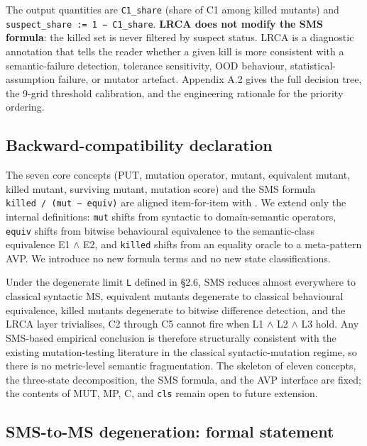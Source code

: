 \documentclass[acmsmall,screen,review]{acmart}
\begin{document}
The output quantities are \texttt{C1\_share} (share of C1 among killed
mutants) and \texttt{suspect\_share\ :=\ 1\ −\ C1\_share}. \textbf{LRCA
does not modify the SMS formula}: the killed set is never filtered by
suspect status. LRCA is a diagnostic annotation that tells the reader
whether a given kill is more consistent with a semantic-failure
detection, tolerance sensitivity, OOD behaviour, statistical-assumption
failure, or mutator artefact. Appendix A.2 gives the full decision tree, the 9-grid
threshold calibration, and the engineering rationale for the priority
ordering.

\subsection{Backward-compatibility declaration}\label{backward-compatibility-declaration}

The seven core concepts (PUT, mutation operator, mutant, equivalent
mutant, killed mutant, surviving mutant, mutation score) and the SMS
formula
\texttt{\textbar{}killed\textbar{}\ /\ (\textbar{}mut\textbar{}\ −\ \textbar{}equiv\textbar{})}
are aligned item-for-item with \citet{d7c38286734419b52de4262c9802ebdfcf4b9447}. We extend only the
internal definitions: \texttt{mut} shifts from syntactic to
domain-semantic operators, \texttt{equiv} shifts from bitwise
behavioural equivalence to the semantic-class equivalence E1 $\wedge$ E2, and
\texttt{killed} shifts from an equality oracle to a meta-pattern AVP. We
introduce no new formula terms and no new state classifications.

Under the degenerate limit \texttt{L} defined in §2.6, SMS reduces
almost everywhere to classical syntactic MS, equivalent mutants
degenerate to classical behavioural equivalence, killed mutants
degenerate to bitwise difference detection, and the LRCA layer
trivialises, C2 through C5 cannot fire when L1 $\wedge$ L2 $\wedge$ L3 hold. Any
SMS-based empirical conclusion is therefore structurally consistent with
the existing mutation-testing literature in the classical
syntactic-mutation regime, so there is no metric-level semantic
fragmentation. The skeleton of eleven concepts, the three-state
decomposition, the SMS formula, and the AVP interface are fixed; the
contents of MUT, MP, C, and \texttt{cls} remain open to future
extension.

\subsection{SMS-to-MS degeneration: formal statement}\label{sms-ms-degeneration-formal-statement}
\end{document}
